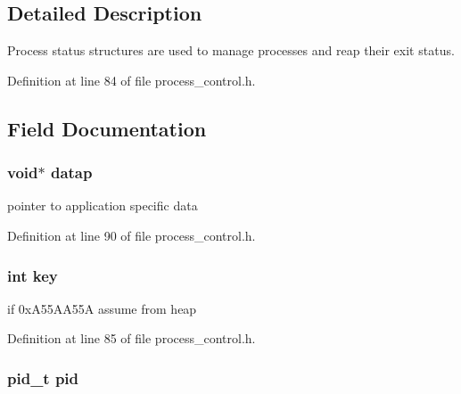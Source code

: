 \subsection{Detailed Description}
Process status structures are used to manage processes and reap their exit status. 

Definition at line 84 of file process\-\_\-control.\-h.



\subsection{Field Documentation}
\hypertarget{struct_p_r_o_c___s_t_a_t_u_s_aeb5cadc7793d3e5ed0c725dbb3c04491}{
\subsubsection[{datap}]{\setlength{\rightskip}{0pt plus 5cm}void$\ast$ datap}}\label{struct_p_r_o_c___s_t_a_t_u_s_aeb5cadc7793d3e5ed0c725dbb3c04491}


pointer to application specific data 



Definition at line 90 of file process\-\_\-control.\-h.

\hypertarget{struct_p_r_o_c___s_t_a_t_u_s_a35af0be900467fedbb610bd6ea65ed78}{
\subsubsection[{key}]{\setlength{\rightskip}{0pt plus 5cm}int key}}\label{struct_p_r_o_c___s_t_a_t_u_s_a35af0be900467fedbb610bd6ea65ed78}


if 0x\-A55\-A\-A55\-A assume from heap 



Definition at line 85 of file process\-\_\-control.\-h.

\hypertarget{struct_p_r_o_c___s_t_a_t_u_s_ae0d46a978d5cd6707411f276ad869b9c}{
\subsubsection[{pid}]{\setlength{\rightskip}{0pt plus 5cm}pid\-\_\-t pid}}\label{struct_p_r_o_c___s_t_a_t_u_s_ae0d46a978d5cd6707411f276ad869b9c}


